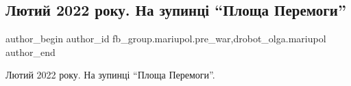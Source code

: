  
 
 
 
 

\subsection{Лютий 2022 року. На зупинці \enquote{Площа Перемоги}}
\label{sec:01_03_2023.fb.fb_group.mariupol.pre_war.2.lyutii_2022_roku__na}
 
\ifcmt
 author_begin
   author_id fb_group.mariupol.pre_war,drobot_olga.mariupol
 author_end
\fi

Лютий 2022 року. На зупинці \enquote{Площа Перемоги}.

